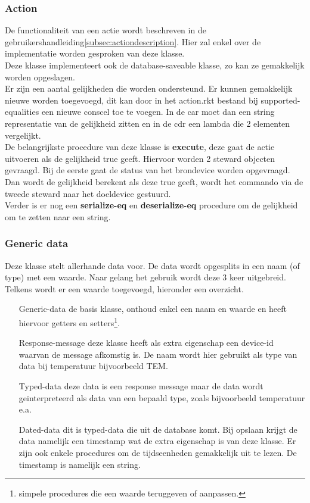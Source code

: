 \documentclass{article}
\begin{document}
\subsubsection{Action}
\label{ssub:action}
De functionaliteit van een actie wordt beschreven in de gebruikershandleiding\ref{subsec:actiondescription}. Hier zal enkel over de implementatie worden gesproken van deze klasse.\\
Deze klasse implementeert ook de database-saveable klasse, zo kan ze gemakkelijk worden opgeslagen.\\
Er zijn een aantal gelijkheden die worden ondersteund. Er kunnen gemakkelijk nieuwe worden toegevoegd, dit kan door in het action.rkt bestand bij supported-equalities een nieuwe conscel toe te voegen. In de car moet dan een string representatie van de gelijkheid zitten en in de cdr een lambda die 2 elementen vergelijkt.\\
De belangrijkste procedure van deze klasse is \textbf{execute}, deze gaat de actie uitvoeren als de gelijkheid true geeft. Hiervoor worden 2 steward objecten gevraagd. Bij de eerste gaat de status van het brondevice worden opgevraagd. Dan wordt de gelijkheid berekent als deze true geeft, wordt het commando via de tweede steward naar het doeldevice gestuurd.\\
Verder is er nog een \textbf{serialize-eq} en \textbf{deserialize-eq} procedure om de gelijkheid om te zetten naar een string.\\

\subsubsection{Generic data}
\label{ssub:generic-data}
Deze klasse stelt allerhande data voor. De data wordt opgesplits in een naam (of type) met een waarde. Naar gelang het gebruik wordt deze 3 keer uitgebreid. Telkens wordt er een waarde toegevoegd, hieronder een overzicht.
\begin{itemize}
	\item[Generic-data] de basis klasse, onthoud enkel een naam en waarde en heeft hiervoor getters en setters\footnote{simpele procedures die een waarde teruggeven of aanpassen.}.
	\item[Response-message] deze klasse heeft als extra eigenschap een device-id waarvan de message afkomstig is. De naam wordt hier gebruikt als type van data bij temperatuur bijvoorbeeld TEM.
	\item[Typed-data] deze data is een response message maar de data wordt ge\"interpreteerd als data van een bepaald type, zoals bijvoorbeeld temperatuur e.a.
	\item[Dated-data] dit is typed-data die uit de database komt. Bij opslaan krijgt de data namelijk een timestamp wat de extra eigenschap is van deze klasse. Er zijn ook enkele procedures om de tijdseenheden gemakkelijk uit te lezen. De timestamp is namelijk een string.
\end{itemize}
\end{document}

